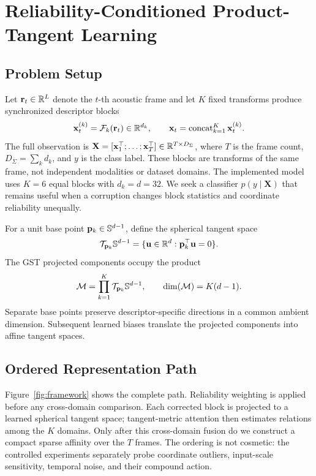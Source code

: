 \section{Reliability-Conditioned Product-Tangent Learning}

\subsection{Problem Setup}
Let $\mathbf r_t\in\mathbb{R}^L$ denote the $t$-th acoustic frame and let $K$ fixed transforms produce synchronized descriptor blocks
\begin{equation}
\mathbf x_t^{(k)}=\mathcal F_k(\mathbf r_t)\in\mathbb{R}^{d_k},\qquad
\mathbf x_t=\operatorname{concat}_{k=1}^{K}\mathbf x_t^{(k)}.
\label{eq:domain-feature}
\end{equation}
The full observation is $\mathbf X=[\mathbf x_1^\top;\ldots;\mathbf x_T^\top]\in\mathbb{R}^{T\times D_\Sigma}$, where $T$ is the frame count, $D_\Sigma=\sum_k d_k$, and $y$ is the class label. These blocks are transforms of the same frame, not independent modalities or dataset domains. The implemented model uses $K=6$ equal blocks with $d_k=d=32$. We seek a classifier $p(y\mid\mathbf X)$ that remains useful when a corruption changes block statistics and coordinate reliability unequally.

For a unit base point $\mathbf p_k\in\mathbb{S}^{d-1}$, define the spherical tangent space
\begin{equation}
\mathcal{T}_{\mathbf p_k}\mathbb{S}^{d-1}
=\{\mathbf u\in\mathbb{R}^d:\mathbf p_k^\top\mathbf u=0\}.
\label{eq:tangent-space}
\end{equation}
The GST projected components occupy the product
\begin{equation}
\mathcal{M}=\prod_{k=1}^{K}\mathcal{T}_{\mathbf p_k}\mathbb{S}^{d-1},
\qquad \dim(\mathcal{M})=K(d-1).
\label{eq:product-space}
\end{equation}
Separate base points preserve descriptor-specific directions in a common ambient dimension. Subsequent learned biases translate the projected components into affine tangent spaces.

\subsection{Ordered Representation Path}
Figure~\ref{fig:framework} shows the complete path. Reliability weighting is applied before any cross-domain comparison. Each corrected block is projected to a learned spherical tangent space; tangent-metric attention then estimates relations among the $K$ domains. Only after this cross-domain fusion do we construct a compact sparse affinity over the $T$ frames. The ordering is not cosmetic: the controlled experiments separately probe coordinate outliers, input-scale sensitivity, temporal noise, and their compound action.

